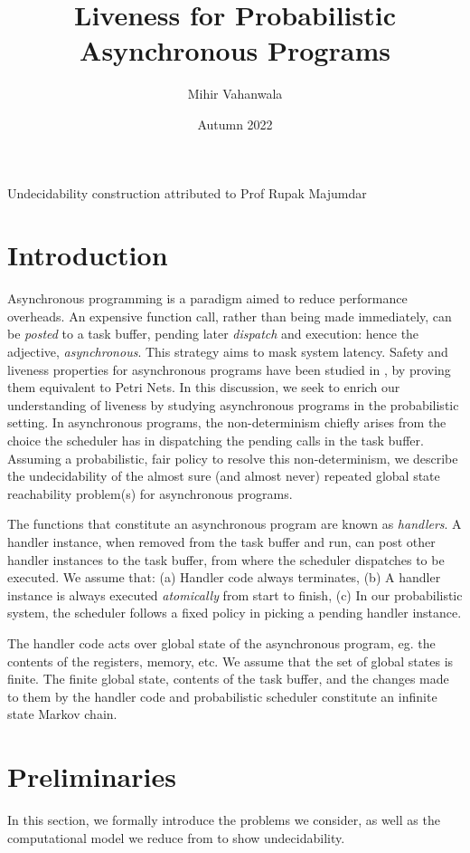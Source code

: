 \documentclass{article}
\title{Liveness for Probabilistic Asynchronous Programs}
\author{Mihir Vahanwala}
\date{Autumn 2022}
\theoremstyle{remark}
\begin{document}
\maketitle
Undecidability construction attributed to Prof Rupak Majumdar
\section{Introduction}
Asynchronous programming is a paradigm aimed to reduce performance overheads. An expensive function call, rather than being made immediately, can be \textit{posted} to a task buffer, pending later \textit{dispatch} and execution: hence the adjective, \textit{asynchronous}. This strategy aims to mask system latency. Safety and liveness properties for asynchronous programs have been studied in \cite{asyncalgo2012}, by proving them equivalent to Petri Nets. In this discussion, we seek to enrich our understanding of liveness by studying asynchronous programs in the probabilistic setting. In asynchronous programs, the non-determinism chiefly arises from the choice the scheduler has in dispatching the pending calls in the task buffer. Assuming a probabilistic, fair policy to resolve this non-determinism, we describe the undecidability of the almost sure (and almost never) repeated global state reachability problem(s) for asynchronous programs.

The functions that constitute an asynchronous program are known as \textit{handlers}. A handler instance, when removed from the task buffer and run, can post other handler instances to the task buffer, from where the scheduler dispatches to be executed. We assume that: (a) Handler code always terminates, (b) A handler instance is always executed \textit{atomically} from start to finish, (c) In our probabilistic system, the scheduler follows a fixed policy in picking a pending handler instance.

The handler code acts over global state of the asynchronous program, eg. the contents of the registers, memory, etc. We assume that the set of global states is finite. The finite global state, contents of the task buffer, and the changes made to them by the handler code and probabilistic scheduler constitute an infinite state Markov chain.

\section{Preliminaries}
In this section, we formally introduce the problems we consider, as well as the computational model we reduce from to show undecidability. 
\end{document}
